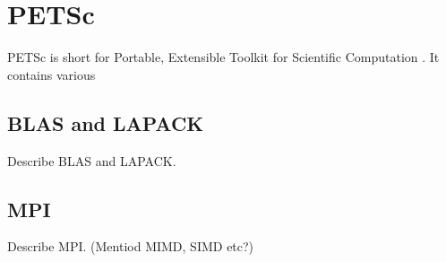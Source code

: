 \section*{PETSc}

PETSc is short for Portable, Extensible Toolkit for Scientific Computation \cite{PETScWebpage}. It 
contains various 

\subsection*{BLAS and LAPACK}

Describe BLAS and LAPACK.

\subsection*{MPI}

Describe MPI. (Mentiod MIMD, SIMD etc?)

